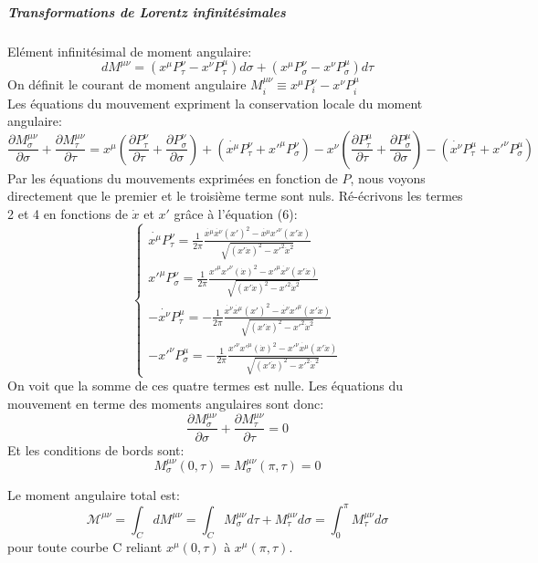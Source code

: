 \documentclass[a4paper,12pt]{article}
\def\xmu{x^\mu}
\begin{document}
\subparagraph{Transformations de Lorentz infinitésimales}
Elément infinitésimal de moment angulaire:
$$dM^{\mu\nu}=(x^{\mu}P^{\nu}_{\tau}-x^{\nu}P^{\mu}_{\tau})d\sigma+(x^{\mu}P^{\nu}_{\sigma}-x^{\nu}P^{\mu}_{\sigma})d\tau$$
On définit le courant de moment angulaire $M_{i}^{\mu\nu}\equiv x^{\mu}P^{\nu}_{i}-x^{\nu}P^{\mu}_{i}$\\
Les équations du mouvement expriment la conservation locale du moment angulaire:
$$\frac{\partial M_{\sigma}^{\mu\nu}}{\partial \sigma}+\frac{\partial M_{\tau}^{\mu\nu}}{\partial \tau}=x^{\mu}\left( \frac{\partial P^{\nu}_{\tau}}{\partial \tau}+\frac{\partial P^{\nu}_{\sigma}}{\partial \sigma}\right) +\left( \dot{x^{\mu}}P^{\nu}_{\tau}+x'^{\mu}P^{\nu}_{\sigma}\right) -x^{\nu}\left( \frac{\partial P^{\mu}_{\tau}}{\partial \tau}+\frac{\partial P^{\mu}_{\sigma}}{\partial \sigma}\right) -\left( \dot{x^{\nu}}P^{\mu}_{\tau}+x'^{\nu}P^{\mu}_{\sigma}\right)$$
Par les équations du mouvements exprimées en fonction de $P$, nous voyons directement que le premier et le troisième terme sont nuls. 
Ré-écrivons les termes 2 et 4 en fonctions de $\dot{x}$ et $x'$ grâce à l'équation (6):
\begin{equation}
	\left\lbrace
	\begin{aligned}
	\dot{x^{\mu}}P^{\nu}_{\tau}=\frac{1}{2\pi}\frac{\dot{\xmu}\dot{x^\nu}(x')^2-\dot{\xmu}x'^\nu(x'\dot{x})}{\sqrt{(x'\dot{x})^2-x'^2\dot{x}^2}}\\
	x'^{\mu}P^{\nu}_{\sigma}=\frac{1}{2\pi}\frac{x'^\mu x'^\nu (\dot{x})^2-x'^{\mu}\dot{x^\nu}(x'\dot{x})}{\sqrt{(x'\dot{x})^2-x'^2\dot{x}^2}}\\
	-\dot{x^{\nu}}P^{\mu}_{\tau}=-\frac{1}{2\pi}\frac{\dot{x^\nu}\dot{\xmu}(x')^2-\dot{x^\nu}x'^\mu(x'\dot{x})}{\sqrt{(x'\dot{x})^2-x'^2\dot{x}^2}}\\
	-x'^{\nu}P^{\mu}_{\sigma}=-\frac{1}{2\pi}\frac{x'^{\nu}x'^\mu (\dot{x})^2-x'^{\nu}\dot{\xmu}(x'\dot{x})}{\sqrt{(x'\dot{x})^2-x'^2\dot{x}^2}}
	\end{aligned}
	\right.
\end{equation}
On voit que la somme de ces quatre termes est nulle.
Les équations du mouvement en terme des moments angulaires sont donc:
$$\frac{\partial M_{\sigma}^{\mu\nu}}{\partial \sigma}+\frac{\partial M_{\tau}^{\mu\nu}}{\partial \tau}=0$$
Et les conditions de bords sont:
$$M_{\sigma}^{\mu\nu}(0,\tau)=M_{\sigma}^{\mu\nu}(\pi,\tau)=0$$

Le moment angulaire total est: 
$$\mathcal{M^{\mu\nu}}=\int_{C}dM^{\mu\nu}=\int_{C}M^{\mu\nu}_{\sigma}d\tau+M^{\mu\nu}_{\tau}d\sigma=\int_{0}^{\pi}M^{\mu\nu}_{\tau}d\sigma$$
pour toute courbe C reliant $x^{\mu}(0,\tau)$ à $x^{\mu}(\pi,\tau)$.
\end{document}
